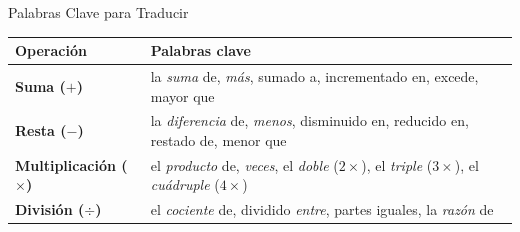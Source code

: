 \documentclass[12pt, letterpaper]{article}
\begin{document}
\begin{concepto}{Palabras Clave para Traducir}
	\vspace{0.2cm}
	\renewcommand{\arraystretch}{1.5}
	\begin{center}
		\begin{longtable}{|m{3cm}|m{10cm}|}
			\hline
			\rowcolor{valblue!80}
			\color{white}\textbf{Operación}    & \color{white}\textbf{Palabras clave} \\
			\hline
			\rowcolor{vallightgreen}
			\textbf{Suma ($+$)}                &
			la \textit{suma} de,\; \textit{más},\; sumado a,\;
			incrementado en,\; excede,\; mayor que                                    \\
			\hline
			\rowcolor{vallightred}
			\textbf{Resta ($-$)}               &
			la \textit{diferencia} de,\; \textit{menos},\;
			disminuido en,\; reducido en,\; restado de,\; menor que                   \\
			\hline
			\rowcolor{vallightblue}
			\textbf{Multiplicación ($\times$)} &
			el \textit{producto} de,\; \textit{veces},\;
			el \textit{doble} ($2\times$),\; el \textit{triple} ($3\times$),\;
			el \textit{cuádruple} ($4\times$)                                         \\
			\hline
			\rowcolor{vallightorange}
			\textbf{División ($\div$)}         &
			el \textit{cociente} de,\; dividido \textit{entre},\;
			partes iguales,\; la \textit{razón} de                                    \\
			\hline
		\end{longtable}
	\end{center}
\end{concepto}
\end{document}
